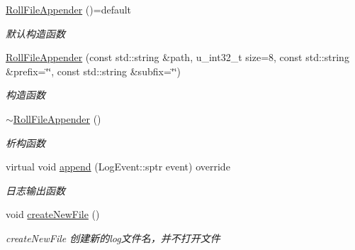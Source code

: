 \begin{DoxyCompactItemize}
\item 
\mbox{\label{classDAQ_1_1RollFileAppender_ac3f22e7355e4648b9f8c55210c4a48f5}} 
\hyperlink{classDAQ_1_1RollFileAppender_ac3f22e7355e4648b9f8c55210c4a48f5}{Roll\+File\+Appender} ()=default
\begin{DoxyCompactList}\small\item\em 默认构造函数 \end{DoxyCompactList}\item 
\hyperlink{classDAQ_1_1RollFileAppender_a9ca22efe9d46c9b6a2640ca62ae5574e}{Roll\+File\+Appender} (const std\+::string \&path, u\+\_\+int32\+\_\+t size=8, const std\+::string \&prefix=\char`\"{}\char`\"{}, const std\+::string \&subfix=\char`\"{}\char`\"{})
\begin{DoxyCompactList}\small\item\em 构造函数 \end{DoxyCompactList}\item 
\mbox{\label{classDAQ_1_1RollFileAppender_a01ac52e95b2d62e4fb9acf17b73670dd}} 
\hyperlink{classDAQ_1_1RollFileAppender_a01ac52e95b2d62e4fb9acf17b73670dd}{$\sim$\+Roll\+File\+Appender} ()
\begin{DoxyCompactList}\small\item\em 析构函数 \end{DoxyCompactList}\item 
virtual void \hyperlink{classDAQ_1_1RollFileAppender_a81223817b0bc2a365a8fa70271766bc2}{append} (Log\+Event\+::sptr event) override
\begin{DoxyCompactList}\small\item\em 日志输出函数 \end{DoxyCompactList}\item 
\mbox{\label{classDAQ_1_1RollFileAppender_ae5ad9874ab7775d5d6df97242eeba5c6}} 
void \hyperlink{classDAQ_1_1RollFileAppender_ae5ad9874ab7775d5d6df97242eeba5c6}{create\+New\+File} ()
\begin{DoxyCompactList}\small\item\em create\+New\+File 创建新的log文件名，并不打开文件 \end{DoxyCompactList}\item 
\mbox{\label{classDAQ_1_1RollFileAppender_aa261388f488979a3ee02ccf66fe69a2f}} 

\end{DoxyCompactItemize}
